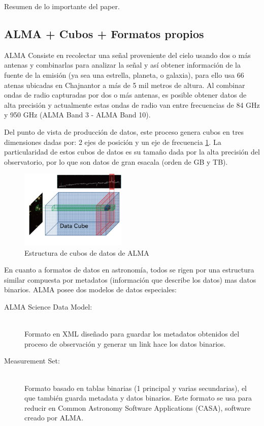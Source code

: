 Resumen de lo importante del paper.



\subsection{ALMA + Cubos + Formatos propios}

ALMA Consiste en recolectar una señal proveniente del cielo usando dos o más antenas y combinarlas para analizar la señal y así obtener información de la fuente de la emisión (ya sea una estrella, planeta, o galaxia), para ello usa 66 atenas ubicadas en Chajnantor a más de 5 mil metros de altura. Al combinar ondas de radio capturadas por dos o más antenas, es posible obtener datos de alta precisión y actualmente estas ondas de radio van entre frecuencias de 84 GHz y 950 GHz (ALMA Band 3 - ALMA Band 10). 

Del punto de vista de producción de datos, este proceso genera cubos en tres dimensiones dadas por: 2 ejes de posición y un eje de frecuencia \ref{fig:cube}. La particularidad de estos cubos de datos es su tamaño dada por la alta precisión del observatorio, por lo que son datos de gran esacala (orden de GB y TB).

\begin{figure}[ht]
    \centering
    \includegraphics[width=0.45\textwidth]{images/cube.png}
    \caption{Estructura de cubos de datos de ALMA \cite{dent20132}}
    \label{fig:cube}
\end{figure}

En cuanto a formatos de datos en astronomía, todos se rigen por una estructura similar compuesta por metadatos (información que describe los datos) mas datos binarios. ALMA posee dos modelos de datos especiales:
\begin{description}
    \item[ALMA Science Data Model:] \hfill \\
    	Formato en XML diseñado para guardar los metadatos obtenidos del proceso de observación y generar un link hace los datos binarios.
    \item[Measurement Set:] \hfill \\
    	Formato basado en tablas binarias (1 principal y varias secundarias), el que también guarda metadata y datos binarios. Este formato se usa para reducir en Common Astronomy Software Applications (CASA), software creado por ALMA.
\end{description}
